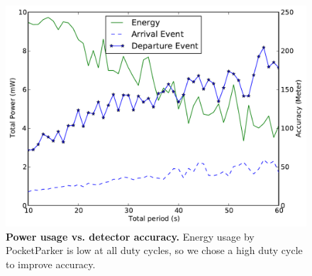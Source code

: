 \documentclass{sigchi}
\begin{document}
\begin{figure}[t]
\centering
\includegraphics[width=\columnwidth]{./figures/Energy_accuracy.pdf}

\caption{\textbf{Power usage vs. detector accuracy.} Energy usage by
PocketParker is low at all duty cycles, so we chose a high duty cycle to
improve accuracy.}

\label{fig-energy}
\end{figure}
\end{document}
